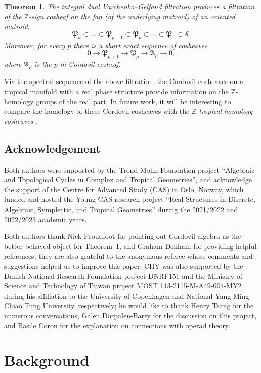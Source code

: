 \documentclass{amsart}
\newcounter{mainTheorem}
\newtheorem{maintheorem}[mainTheorem]{Theorem}
\newcommand\ZZ{{\mathbb Z}}
\newcommand\Pfrak{{\mathfrak P}}
\begin{document}
{\begin{maintheorem} \label{mainthm:Z_cosheaf}
The integral dual Varchenko--Gelfand filtration produces a filtration of the $\mathbb{Z}$-sign cosheaf on the fan (of the underlying matroid) of an oriented matroid,
$$\Pfrak_d  \subset  \dots \subset \Pfrak_{p+1} \subset \Pfrak_p \subset \dots \subset \Pfrak_1 \subset \mathcal{S}.$$
Moreover, for every $p$ there is a short  exact sequence of cosheaves 
$$0 \to \Pfrak_{p+1} \to \Pfrak_p \to \mathfrak{A}_p \to 0,$$ where $\mathfrak{A}_p$ is the $p$-th {\em Cordovil cosheaf}. 

\end{maintheorem}

Via the spectral sequence of the above filtration, the Cordovil cosheaves on a tropical manifold with a real phase structure provide information on the $\ZZ$-homology groups of the real part. In future work, it will be interesting to compare the homology of these Cordovil cosheaves with the {\em $\ZZ$-tropical homology cosheaves} \cite{IKMZ}.

\subsection*{Acknowledgement}
Both authors were supported by the Trond Mohn Foundation project ``Algebraic and Topological Cycles in Complex and Tropical Geometries'', and acknowledge the support of the Centre for Advanced Study (CAS) in Oslo, Norway, which funded and hosted the Young CAS research project ``Real Structures in Discrete, Algebraic, Symplectic, and Tropical Geometries'' during the 2021/2022 and 2022/2023 academic years.

Both authors thank Nick Proudfoot for pointing out Cordovil algebra as the better-behaved object for Theorem~\ref{mainthm:Z_cosheaf}, and Graham Denham for providing helpful references; they are also grateful to the anonymous referee whose comments and suggestions helped us to improve this paper. 
CHY was also supported by the Danish National Research Foundation project DNRF151 and the Ministry of Science and Technology of Taiwan project MOST 113-2115-M-A49-004-MY2 during his affiliation to the University of Copenhagen and National Yang Ming Chiao Tung University, respectively; he would like to thank Henry Tsang for the numerous conversations, Galen Dorpalen-Barry for the discussion on this project, and Basile Coron for the explanation on connections with operad theory.

\section{Background}

}
\end{document}
